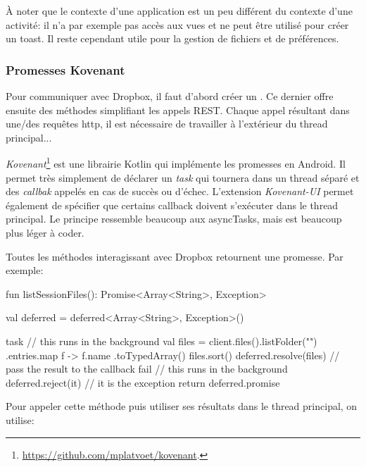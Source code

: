 À noter que le contexte d'une application est un peu différent du contexte d'une activité: il n'a par exemple pas accès aux vues et ne peut être utilisé pour créer un toast. Il reste cependant utile pour la gestion de fichiers et de préférences.


\subsubsection*{Promesses Kovenant}

Pour communiquer avec Dropbox, il faut d'abord créer un . Ce dernier offre ensuite des méthodes simplifiant les appels REST. Chaque appel résultant dans une/des requêtes http, il est nécessaire de travailler à l'extérieur du thread principal...

\emph{Kovenant}\footnote{\url{https://github.com/mplatvoet/kovenant}.} est une librairie Kotlin qui implémente les promesses en Android. Il permet très simplement de déclarer un \emph{task} qui tournera dans un thread séparé et des \emph{callbak} appelés en cas de succès ou d'échec. L'extension \emph{Kovenant-UI} permet également de spécifier que certains callback doivent s'exécuter dans le thread principal. Le principe ressemble beaucoup aux asyncTasks, mais est beaucoup plus léger à coder. 

Toutes les méthodes interagissant avec Dropbox retournent une promesse. Par exemple:

\begin{kotlincode}
fun listSessionFiles(): Promise<Array<String>, Exception> {
    val deferred = deferred<Array<String>, Exception>()

    task {
        // this runs in the background
        val files = client.files().listFolder("")
            .entries.map { f -> f.name }.toTypedArray()
        files.sort()
        deferred.resolve(files) // pass the result to the callback
    } fail {
        // this runs in the background
        deferred.reject(it) // it is the exception
    }
    return deferred.promise
}
\end{kotlincode}

Pour appeler cette méthode puis utiliser ses résultats dans le thread principal, on utilise:


